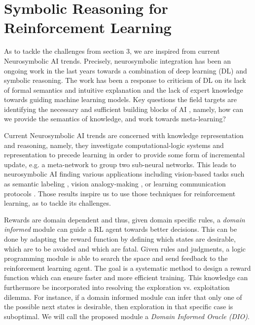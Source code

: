\documentclass[a4paper,11pt]{article}
\theoremstyle{definition}
\begin{document}
\section{Symbolic Reasoning for Reinforcement Learning} \label{symrl}
As to tackle the challenges from section 3, we are inspired from current Neurosymbolic AI trends. Precisely, neurosymbolic integration has been an ongoing work in the last years towards a combination of deep learning (DL) and symbolic reasoning.
The work has been a response to criticism of DL on its lack of formal semantics and intuitive explanation and the lack of expert knowledge towards guiding machine learning models. 
Key questions the field targets are identifying the necessary and sufficient building blocks of AI \cite{garcez2020neurosymbolic}, namely, how can we provide the semantics of knowledge, 
and work towards meta-learning? 

Current Neurosymbolic AI trends are concerned with knowledge representation and reasoning, namely, they investigate computational-logic systems 
and representation to precede learning in order to provide some form of incremental update, e.g. a meta-network to group two sub-neural networks. \cite{Besold2017NeuralSymbolicLA}
This leads to neurosymbolic AI finding various applications including vision-based tasks such as semantic labeling \cite{vinyals2015, karpathy2015}, 
vision analogy-making \cite{Reed2015DeepVA}, or learning communication protocols \cite{Foerster2016LearningTC}. Those results inspire us to use those techniques for reinforcement learning, as to tackle its challenges.

\medskip
Rewards are domain dependent and thus, given domain specific rules, a \emph{domain informed} module can guide a RL agent towards better decisions. This can be done by 
adapting the reward function by defining which states are desirable, which are to be avoided and which are fatal. Given rules and judgments, a logic programming module 
is able to search the space and send feedback to the reinforcement learning agent. The goal is a systematic method to design a reward function which can ensure faster and more efficient 
training. This knowledge can furthermore be incorporated into resolving the exploration vs. exploitation dilemma. For instance, if a domain informed module 
can infer that only one of the possible next states is desirable, then exploration in that specific case is suboptimal.  
We will call the proposed module a \emph{Domain Informed Oracle (DIO)}. 
\end{document}
